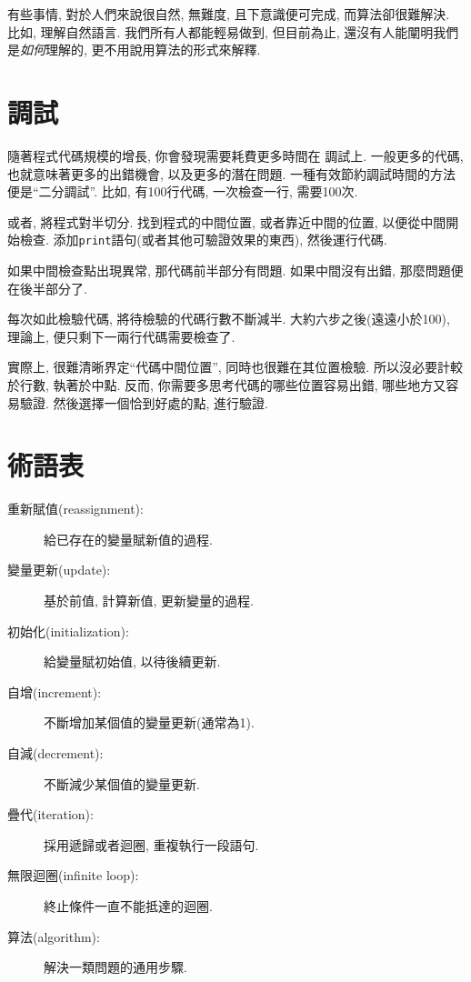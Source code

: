 \documentclass[10pt]{book}
\begin{document}
有些事情, 對於人們來說很自然, 無難度, 且下意識便可完成, 
而算法卻很難解決. 
比如, 理解自然語言. 我們所有人都能輕易做到, 
但目前為止, 還沒有人能闡明我們是{\em 如何}理解的, 
更不用說用算法的形式來解釋. 

\section{調試}
\label{bisectbug}
隨著程式代碼規模的增長, 你會發現需要耗費更多時間在
調試上. 一般更多的代碼, 也就意味著更多的出錯機會, 
以及更多的潛在問題. 
一種有效節約調試時間的方法便是``二分調試''.
比如, 有100行代碼, 一次檢查一行, 需要100次. 

或者, 將程式對半切分. 找到程式的中間位置, 或者靠近中間的位置, 
以便從中間開始檢查. 添加{\tt print}語句(或者其他可驗證效果的東西), 
然後運行代碼. 

如果中間檢查點出現異常, 那代碼前半部分有問題. 
如果中間沒有出錯, 那麼問題便在後半部分了. 

每次如此檢驗代碼, 將待檢驗的代碼行數不斷減半. 大約六步之後(遠遠小於100), 
理論上, 便只剩下一兩行代碼需要檢查了. 

實際上, 很難清晰界定``代碼中間位置'', 同時也很難在其位置檢驗. 
所以沒必要計較於行數, 執著於中點. 
反而, 你需要多思考代碼的哪些位置容易出錯, 哪些地方又容易驗證. 
然後選擇一個恰到好處的點, 進行驗證. 



\section{術語表}

\begin{description}

\item[重新賦值(reassignment):] 給已存在的變量賦新值的過程. 

\item[變量更新(update):] 基於前值, 計算新值, 更新變量的過程. 

\item[初始化(initialization):] 給變量賦初始值, 以待後續更新. 

\item[自增(increment):] 不斷增加某個值的變量更新(通常為1). 

\item[自減(decrement):] 不斷減少某個值的變量更新. 

\item[疊代(iteration):] 採用遞歸或者迴圈, 重複執行一段語句. 

\item[無限迴圈(infinite loop):] 終止條件一直不能抵達的迴圈. 

\item[算法(algorithm):]  解決一類問題的通用步驟. 

\end{description}
\end{document}
